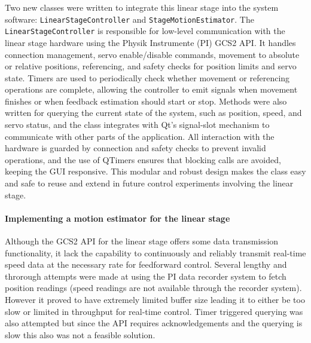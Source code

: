 Two new classes were written to integrate this linear stage into the system software: \texttt{LinearStageController} and \texttt{StageMotionEstimator}. The \texttt{LinearStageController} is responsible for low-level communication with the linear stage hardware using the Physik Instrumente (PI) GCS2 API. It handles connection management, servo enable/disable commands, movement to absolute or relative positions, referencing, and safety checks for position limits and servo state. Timers are used to periodically check whether movement or referencing operations are complete, allowing the controller to emit signals when movement finishes or when feedback estimation should start or stop.
\newline \newline
Methods were also written for querying the current state of the system, such as position, speed, and servo status, and the class integrates with Qt’s signal-slot mechanism to communicate with other parts of the application. All interaction with the hardware is guarded by connection and safety checks to prevent invalid operations, and the use of QTimers ensures that blocking calls are avoided, keeping the GUI responsive. This modular and robust design makes the class easy and safe to  reuse and extend in future control experiments involving the linear stage.





\paragraph*{Implementing a motion estimator for the linear stage}
Although the GCS2 API for the linear stage offers some data transmission functionality, it lack the capability to continuously and reliably transmit real-time speed data at the necessary rate for feedforward control. Several lengthy and throrough attempts were made at using the PI data recorder system to fetch position readings (speed readings are not available through the recorder system). However it proved to have extremely limited buffer size leading it to either be too slow or limited in throughput for real-time control. Timer triggered querying was also attempted but since the API requires acknowledgements and the querying is slow this also was not a feasible solution.

